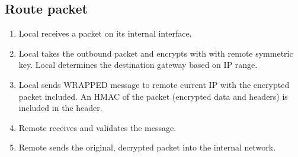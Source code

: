 \subsection{Route packet}
\label{sec:arg_protocol_route}
\begin{enumerate}
	\item Local receives a packet on its internal interface.
	\item Local takes the outbound packet and encrypts with with remote symmetric key. Local determines the destination gateway based on \ac{IP} range.
	\item Local sends WRAPPED message to remote current IP with the encrypted packet included. An \ac{HMAC} of the packet (encrypted data and headers) is included in the header.
	\item Remote receives and validates the message.
	\item Remote sends the original, decrypted packet into the internal network.
\end{enumerate}

